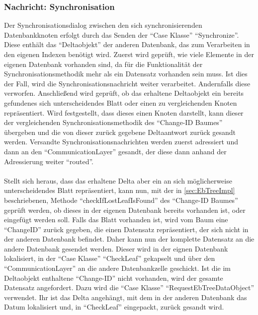 \documentclass[a4paper,11pt,oneside,%
headsepline,												%
footsepline,												%
bibtotocnumbered									%
]{scrreprt}
\begin{document}
\subsubsection{Nachricht: Synchronisation}
Der Synchronisationsdialog zwischen den sich synchronisierenden Datenbankknoten erfolgt durch das Senden der \enquote{Case Klasse} \enquote{Synchronize}. Diese enthält das \enquote{Deltaobjekt} der anderen Datenbank, das zum Verarbeiten in den eigenen Indexen benötigt wird. Zuerst wird geprüft, wie viele Elemente in der eigenen Datenbank vorhanden sind, da für die Funktionalität der Synchronisationsmethodik mehr als ein Datensatz vorhanden sein muss. Ist dies der Fall, wird die Synchronisationsnachricht weiter verarbeitet. Andernfalls diese verworfen. Anschließend wird geprüft, ob das erhaltene Deltaobjekt ein bereits gefundenes sich unterscheidendes Blatt oder einen zu vergleichenden Knoten repräsentiert. Wird festgestellt, dass dieses einen Knoten darstellt, kann dieser der vergleichenden Synchronisationsmethodik des \enquote{Change-ID Baumes} übergeben und die von dieser zurück gegebene Deltaantwort zurück gesandt werden. Versandte Synchronisationsnachrichten werden zuerst adressiert und dann an den \enquote{CommunicationLayer} gesandt, der diese dann anhand der Adressierung weiter \enquote{routed}. \\\\
Stellt sich heraus, dass das erhaltene Delta aber ein an sich möglicherweise unterscheidendes Blatt repräsentiert, kann nun, mit der in \autoref{sec:EbTreeImpl} beschriebenen, Methode \enquote{checkIfLostLeafIsFound} des \enquote{Change-ID Baumes} geprüft werden, ob dieses in der eigenen Datenbank bereits vorhanden ist, oder eingefügt werden soll. Falls das Blatt vorhanden ist, wird vom Baum eine \enquote{ChangeID} zurück gegeben, die einen Datensatz repräsentiert, der sich nicht in der anderen Datenbank befindet. Daher kann nun der komplette Datensatz an die andere Datenbank gesendet werden. Dieser wird in der eignen Datenbank lokalisiert, in der \enquote{Case Klasse} \enquote{CheckLeaf} gekapselt und über den \enquote{CommunicationLayer} an die andere Datenbankzelle geschickt.
Ist die im Deltaobjekt enthaltene \enquote{Change-ID} nicht vorhanden, wird der gesamte Datensatz angefordert. Dazu wird die \enquote{Case Klasse} \enquote{RequestEbTreeDataObject} verwendet. Ihr ist das Delta angehängt, mit dem in der anderen Datenbank das Datum lokalisiert und, in \enquote{CheckLeaf} eingepackt, zurück gesandt wird.\\\\
\end{document}
